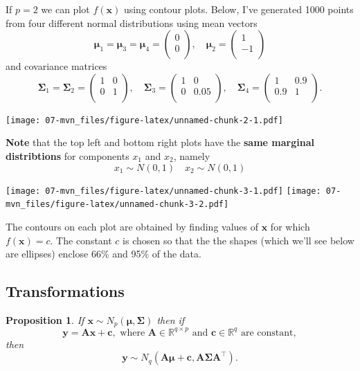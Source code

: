 \documentclass[]{book}
\newtheorem{proposition}{Proposition}[chapter]
\theoremstyle{definition}
\theoremstyle{definition}
\theoremstyle{definition}
\theoremstyle{remark}
\begin{document}
If \(p=2\) we can plot \(f(\mathbf x)\) using contour plots. Below, I've generated 1000 points from four different normal distributions using mean vectors
\[{\boldsymbol{\mu}}_1={\boldsymbol{\mu}}_3={\boldsymbol{\mu}}_4=\begin{pmatrix}0 \\0 \\\end{pmatrix}, \quad {\boldsymbol{\mu}}_2=\begin{pmatrix}1 \\-1 \\\end{pmatrix}\]
and covariance matrices
\[\boldsymbol{\Sigma}_1=\boldsymbol{\Sigma}_2=\begin{pmatrix}1&0 \\0&1 \\\end{pmatrix}, \quad \boldsymbol{\Sigma}_3=\begin{pmatrix}1&0 \\0&0.05 \\\end{pmatrix}, \quad \boldsymbol{\Sigma}_4=\begin{pmatrix}1&0.9 \\0.9&1 \\\end{pmatrix}.\]

\texttt{[image: 07-mvn\_files/figure-latex/unnamed-chunk-2-1.pdf]}

\textbf{Note} that the top left and bottom right plots have the \textbf{same marginal distribtions} for components \(x_1\) and \(x_2\), namely
\[x_1 \sim N(0, 1)\quad x_2 \sim N(0, 1)\]

\texttt{[image: 07-mvn\_files/figure-latex/unnamed-chunk-3-1.pdf]} \texttt{[image: 07-mvn\_files/figure-latex/unnamed-chunk-3-2.pdf]}

The contours on each plot are obtained by finding values of \(\mathbf x\) for which \(f(\mathbf x)=c\). The constant \(c\) is chosen so that the the shapes (which we'll see below are ellipses)
enclose 66\% and 95\% of the data.

\hypertarget{transformations}{%
\subsection{Transformations}\label{transformations}}

\begin{proposition}
\protect\hypertarget{prp:six2}{}{\label{prp:six2} } If \(\mathbf x\sim N_p({\boldsymbol{\mu}},\boldsymbol{\Sigma})\) then if \[\mathbf y= \mathbf A\mathbf x+ \mathbf c, \mbox{ where } \mathbf A\in \mathbb{R}^{q \times p} \mbox{ and }\mathbf c\in \mathbb{R}^q
  \mbox{ are constant},\] then
\[\mathbf y\sim N_q(\mathbf A{\boldsymbol{\mu}}+ \mathbf c, \mathbf A\boldsymbol{\Sigma}\mathbf A^\top).\]
\end{proposition}
\end{document}
